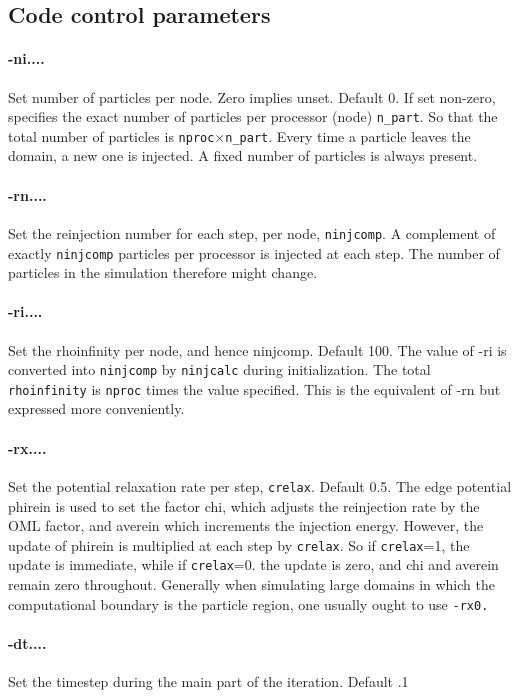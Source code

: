 \documentclass[12pt]{article}
\begin{document}
\subsection{Code control parameters}

\paragraph{-ni....} Set number of particles per node. Zero implies
unset. Default 0.
If set non-zero, specifies the exact number of particles per processor
(node) \verb!n_part!. So that the total number of particles is \verb!nproc!$\times$\verb!n_part!. Every time a particle leaves the domain, a new one is
injected. A fixed number of particles is always present.

\paragraph{-rn....} Set the reinjection number for each step, per
node, \verb!ninjcomp!. 
A complement of exactly \verb!ninjcomp! particles per processor is injected
at each step. The number of particles in the simulation therefore
might change.

\paragraph{-ri....} Set the rhoinfinity per node, and hence
ninjcomp. Default 100. 
The value of -ri is converted into \verb!ninjcomp! by \verb!ninjcalc! during
initialization. The total \verb!rhoinfinity! is \verb!nproc! times the value
specified. This is the equivalent of -rn but expressed more conveniently.

\paragraph{-rx....} 
Set the potential relaxation rate per step, \verb!crelax!. Default 0.5.
The edge potential phirein is used to set the factor chi, which
adjusts the reinjection rate by the OML factor, and averein which
increments the injection energy. However, the update of phirein is
multiplied at each step by \verb!crelax!. So if \verb!crelax!=1, the update is
immediate, while if \verb!crelax!=0. the update is zero, and chi and averein
remain zero throughout. Generally when simulating large domains in
which the computational boundary is the particle region, one usually
ought to use \verb!-rx0.!

\paragraph{-dt....}
 Set the timestep during the main part of the iteration. Default .1
\end{document}
